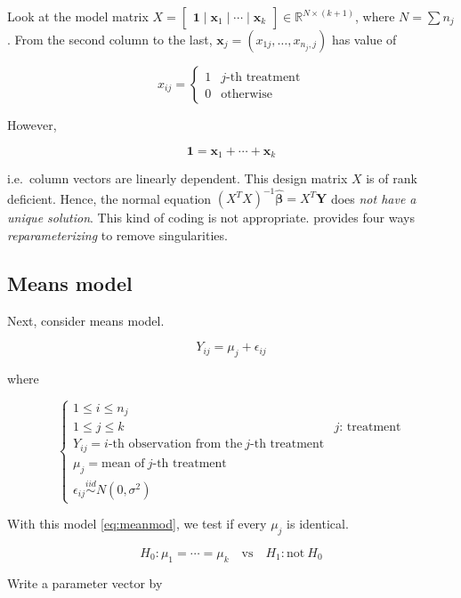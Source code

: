 \documentclass[]{book}
\theoremstyle{definition}
\theoremstyle{definition}
\theoremstyle{definition}
\theoremstyle{remark}
\begin{document}
Look at the model matrix \(X = \begin{bmatrix} \mathbf{1} \mid \mathbf{x}_1 \mid \cdots \mid \mathbf{x}_k \end{bmatrix} \in \mathbb{R}^{N \times (k + 1)}\), where \(N = \sum n_j\). From the second column to the last, \(\mathbf{x}_j = (x_{1j}, \ldots, x_{n_j, j})\) has value of

\[
x_{ij} = \begin{cases}
  1 & j\text{-th treatment} \\
  0 & \text{otherwise}
\end{cases}
\]

However,

\[\mathbf{1} = \mathbf{x}_1 + \cdots + \mathbf{x}_k\]

i.e.~column vectors are linearly dependent. This design matrix \(X\) is of rank deficient. Hence, the normal equation \((X^TX)^{-1}\boldsymbol{\hat\beta}= X^T \mathbf{Y}\) does \emph{not have a unique solution}. This kind of coding is not appropriate. \citet{Rawlings:2006aa} provides four ways \emph{reparameterizing} to remove singularities.

\hypertarget{means-model}{%
\subsection{Means model}\label{means-model}}

Next, consider means model.

\begin{equation}
  Y_{ij} = \mu_j + \epsilon_{ij}
  \label{eq:meanmod}
\end{equation}

where

\[
\begin{cases}
  1 \le i \le n_j \\
  1 \le j \le k & j \text{: treatment} \\
  Y_{ij} = i \text{-th observation from the}\: j \text{-th treatment} \\
  \mu_j = \text{mean of}\: j \text{-th treatment} \\
  \epsilon_{ij} \stackrel{iid}{\sim}N(0, \sigma^2)
\end{cases}
\]

With this model \eqref{eq:meanmod}, we test if every \(\mu_j\) is identical.

\[H_0: \mu_1 = \cdots = \mu_k \quad \text{vs} \quad H_1: \text{not}\: H_0\]

Write a parameter vector by
\end{document}
